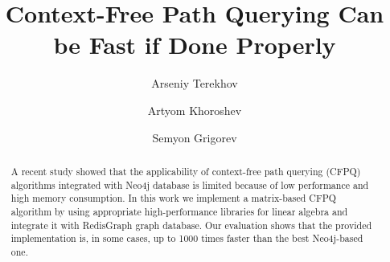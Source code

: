 \documentclass[sigconf,edbt,table]{acmart-edbt2020}
\begin{document}
%
\title[]{Context-Free Path Querying Can be Fast if Done Properly}



%
\author{Arseniy Terekhov}


\author{Artyom Khoroshev}


\author{Semyon Grigorev}





%
\renewcommand{\shortauthors}{Terekhov, Khoroshev, Grigorev}

%
\begin{abstract}
  A recent study showed that the applicability of context-free path querying (CFPQ) algorithms integrated with Neo4j database is limited because of low performance and high memory consumption. In this work we implement a matrix-based CFPQ algorithm by using appropriate high-performance libraries for linear algebra and integrate it with RedisGraph graph database. Our evaluation shows that the provided implementation is, in some cases, up to 1000 times faster than the best Neo4j-based one.
\end{abstract}
\end{document}
